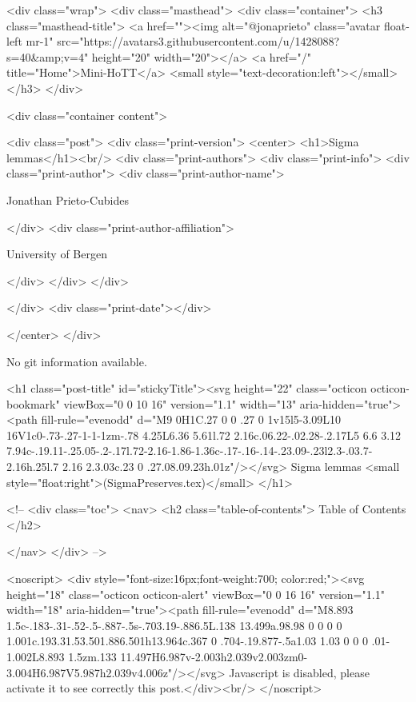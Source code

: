     <div class="wrap">
      <div class="masthead">
        <div class="container">
          <h3 class="masthead-title">
            <a href=""><img alt="@jonaprieto" class="avatar float-left mr-1" src="https://avatars3.githubusercontent.com/u/1428088?s=40&amp;v=4" height="20" width="20"></a>
            <a href="/" title="Home">Mini-HoTT</a>
            <small style="text-decoration:left"></small>
          </h3>
        </div>
      
      <div class="container content">
        







<div class="post">
  <div class="print-version">
    <center>
      <h1>Sigma lemmas</h1><br/>
        <div class="print-authors">
          <div class="print-info">
            <div class="print-author">
              <div class="print-author-name">
                
                  Jonathan Prieto-Cubides
                
              </div>
              <div class="print-author-affiliation">
                
                  University of Bergen
                
                </div>
            </div>
          </div>
          
          
        </div>
        <div class="print-date"></div>
        
        
    </center>
  </div>

  
  No git information available.
  

  <h1 class="post-title" id="stickyTitle"><svg height="22" class="octicon octicon-bookmark" viewBox="0 0 10 16" version="1.1" width="13" aria-hidden="true"><path fill-rule="evenodd" d="M9 0H1C.27 0 0 .27 0 1v15l5-3.09L10 16V1c0-.73-.27-1-1-1zm-.78 4.25L6.36 5.61l.72 2.16c.06.22-.02.28-.2.17L5 6.6 3.12 7.94c-.19.11-.25.05-.2-.17l.72-2.16-1.86-1.36c-.17-.16-.14-.23.09-.23l2.3-.03.7-2.16h.25l.7 2.16 2.3.03c.23 0 .27.08.09.23h.01z"/></svg> Sigma lemmas <small style="float:right">(SigmaPreserves.tex)</small>
  </h1>

  <!-- 
  <div class="toc">
    <nav>
    <h2 class="table-of-contents"> Table of Contents </h2>
      

    </nav>
  </div>
   -->

  <noscript>
  <div style="font-size:16px;font-weight:700; color:red;"><svg height="18" class="octicon octicon-alert" viewBox="0 0 16 16" version="1.1" width="18" aria-hidden="true"><path fill-rule="evenodd" d="M8.893 1.5c-.183-.31-.52-.5-.887-.5s-.703.19-.886.5L.138 13.499a.98.98 0 0 0 0 1.001c.193.31.53.501.886.501h13.964c.367 0 .704-.19.877-.5a1.03 1.03 0 0 0 .01-1.002L8.893 1.5zm.133 11.497H6.987v-2.003h2.039v2.003zm0-3.004H6.987V5.987h2.039v4.006z"/></svg> Javascript is disabled, please activate it to see correctly this post.</div><br/>
  </noscript>

